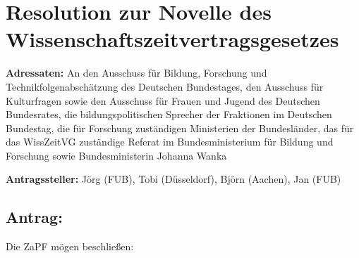 \documentclass[parskip, 10pt,oneside]{scrartcl}
\begin{document}
\section*{Resolution zur Novelle des Wissenschaftszeitvertragsgesetzes}

\textbf{Adressaten:} An den Ausschuss für Bildung, Forschung und Technikfolgenabschätzung des Deutschen Bundestages, den Ausschuss für Kulturfragen sowie den Ausschuss für Frauen und Jugend des Deutschen Bundesrates, die bildungspolitischen Sprecher der Fraktionen im Deutschen Bundestag, die für Forschung zuständigen Ministerien der Bundesländer, das für das WissZeitVG zuständige Referat im Bundesministerium für Bildung und Forschung sowie Bundesministerin Johanna Wanka

\textbf{Antragssteller:} Jörg (FUB), Tobi (Düsseldorf), Björn (Aachen), Jan (FUB)

\subsection*{Antrag:}
Die ZaPF mögen beschließen:
\begin{quote}
	
\end{quote}
\end{document}
